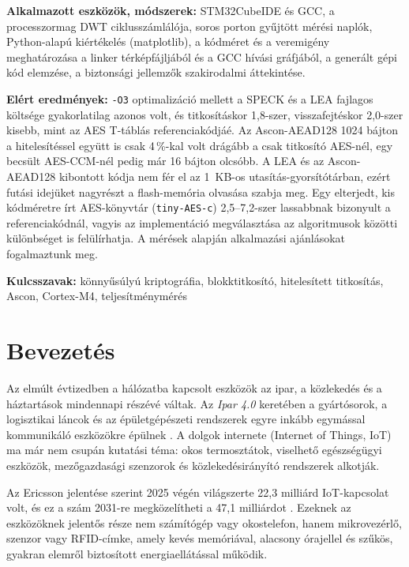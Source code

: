 \documentclass[a4paper,12pt]{report}
\theoremstyle{definition}
\theoremstyle{remark}
\begin{document}
\smallskip
\noindent\textbf{Alkalmazott eszközök, módszerek:} STM32CubeIDE és GCC, a processzormag DWT ciklusszámlálója, soros porton gyűjtött mérési naplók, Python-alapú kiértékelés (matplotlib), a kódméret és a veremigény meghatározása a linker térképfájljából és a GCC hívási gráfjából, a generált gépi kód elemzése, a biztonsági jellemzők szakirodalmi áttekintése.

\smallskip
\noindent\textbf{Elért eredmények:} \texttt{-O3} optimalizáció mellett a SPECK és a LEA fajlagos költsége gyakorlatilag azonos volt, és titkosításkor 1,8-szer, visszafejtéskor 2,0-szer kisebb, mint az AES T-táblás referenciakódjáé. Az Ascon-AEAD128 1024 bájton a hitelesítéssel együtt is csak 4\,\%-kal volt drágább a csak titkosító AES-nél, egy becsült AES-CCM-nél pedig már 16 bájton olcsóbb. A LEA és az Ascon-AEAD128 kibontott kódja nem fér el az 1~KB-os utasítás-gyorsítótárban, ezért futási idejüket nagyrészt a flash-memória olvasása szabja meg. Egy elterjedt, kis kódméretre írt AES-könyvtár (\texttt{tiny-AES-c}) 2,5--7,2-szer lassabbnak bizonyult a referenciakódnál, vagyis az implementáció megválasztása az algoritmusok közötti különbséget is felülírhatja. A mérések alapján alkalmazási ajánlásokat fogalmaztunk meg.

\smallskip
\noindent\textbf{Kulcsszavak:} könnyűsúlyú kriptográfia, blokktitkosító, hitelesített titkosítás, Ascon, Cortex-M4, teljesítménymérés

\begingroup
\singlespacing   %
\tableofcontents
\endgroup

\chapter{Bevezetés}

Az elmúlt évtizedben a hálózatba kapcsolt eszközök az ipar, a közlekedés és a háztartások mindennapi részévé váltak. Az \emph{Ipar 4.0} keretében a gyártósorok, a logisztikai láncok és az épületgépészeti rendszerek egyre inkább egymással kommunikáló eszközökre épülnek \cite{Sadeghi2015}. A dolgok internete (Internet of Things, IoT) ma már nem csupán kutatási téma: okos termosztátok, viselhető egészségügyi eszközök, mezőgazdasági szenzorok és közlekedésirányító rendszerek alkotják.

Az Ericsson jelentése szerint 2025 végén világszerte 22,3 milliárd IoT-kapcsolat volt, és ez a szám 2031-re megközelítheti a 47,1 milliárdot \cite{Ericsson2026}. Ezeknek az eszközöknek jelentős része nem számítógép vagy okostelefon, hanem mikrovezérlő, szenzor vagy RFID-címke, amely kevés memóriával, alacsony órajellel és szűkös, gyakran elemről biztosított energiaellátással működik.
\end{document}
